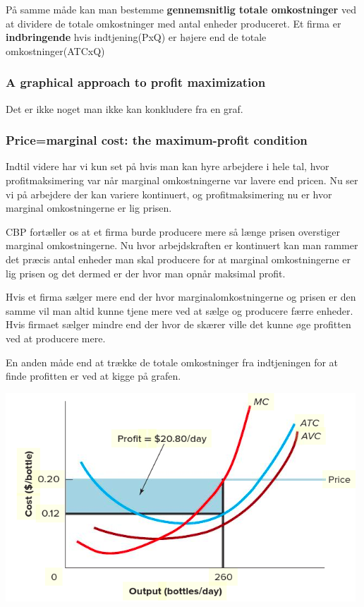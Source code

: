 På samme måde kan man bestemme \textbf{gennemsnitlig totale omkostninger} ved at dividere de totale omkostninger med antal enheder produceret. Et firma er \textbf{indbringende} hvis indtjening(PxQ) er højere end de totale omkostninger(ATCxQ)

\subsubsection{A graphical approach to profit maximization}
Det er ikke noget man ikke kan konkludere fra en graf.

\subsubsection{Price=marginal cost: the maximum-profit condition}
Indtil videre har vi kun set på hvis man kan hyre arbejdere i hele tal, hvor profitmaksimering var når marginal omkostningerne var lavere end pricen. Nu ser vi på arbejdere der kan variere kontinuert, og profitmaksimering nu er hvor marginal omkostningerne er lig prisen.

CBP fortæller os at et firma burde producere mere så længe prisen overstiger marginal omkostningerne. Nu hvor arbejdskraften er kontinuert kan man rammer det præcis antal enheder man skal producere for at marginal omkostningerne er lig prisen og det dermed er der hvor man opnår maksimal profit. 

Hvis et firma sælger mere end der hvor marginalomkostningerne og prisen er den samme vil man altid kunne tjene mere ved at sælge og producere færre enheder. Hvis firmaet sælger mindre end der hvor de skærer ville det kunne øge profitten ved at producere mere.

En anden måde end at trække de totale omkostninger fra indtjeningen for at finde profitten er ved at kigge på grafen. 

\includegraphics[scale=0.8]{Afsnit/Lektion2/Maksprofit2.png}

